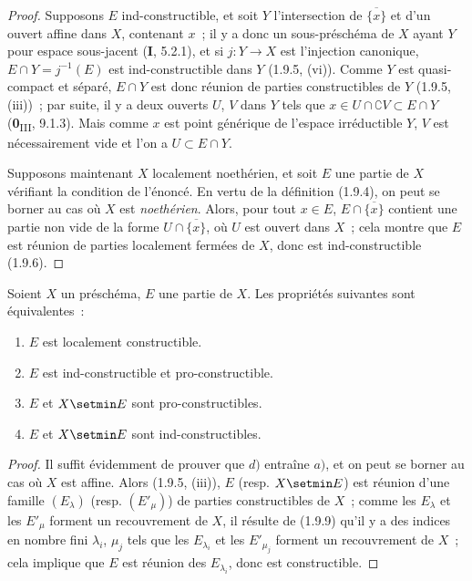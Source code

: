 \begin{proof}
Supposons $E$ ind-constructible, et soit $Y$ l'intersection de
$\overline{\{x\}}$ et d'un ouvert affine dans $X$, contenant $x$~; il y a
donc un sous-préschéma de $X$ ayant $Y$ pour espace sous-jacent (\textbf{I}, 5.2.1),
et si $j:Y\to X$ est l'injection canonique,
$E\cap Y=j^{-1}(E)$ est ind-constructible dans $Y$ (1.9.5, (vi)). Comme $Y$
est quasi-compact et séparé, $E\cap Y$ est donc réunion de parties
constructibles de $Y$ (1.9.5, (iii))~; par suite, il y a deux ouverts $U$,
$V$ dans $Y$ tels que
$x\in U\cap\complement V\subset E\cap Y$ (\textbf{0}\textsubscript{III}, 9.1.3).
Mais comme $x$ est point générique de l'espace irréductible $Y$, $V$ est
nécessairement vide et l'on a $U\subset E\cap Y$.

Supposons maintenant $X$ localement noethérien, et soit $E$ une partie de
$X$ vérifiant la condition de l'énoncé. En vertu de la définition (1.9.4),
on peut se borner au cas où $X$ est \emph{noethérien}. Alors, pour tout $x\in E$,
$E\cap\overline{\{x\}}$ contient une partie non vide de la forme
$U\cap\overline{\{x\}}$, où $U$ est ouvert dans $X$~; cela montre que $E$
est réunion de parties localement fermées de $X$, donc est
ind-constructible (1.9.6).
\end{proof}

\begin{proposition}[1.9.11]
\label{IV.1.9.11-fr}
Soient $X$ un préschéma, $E$ une partie de $X$. Les propriétés suivantes sont
équivalentes~:
\begin{enumerate}
  \item[a)] $E$ est localement constructible.
  \item[b)] $E$ est ind-constructible et pro-constructible.
  \item[c)] $E$ et $X\setmin E$ sont pro-constructibles.
  \item[d)] $E$ et $X\setmin E$ sont ind-constructibles.
\end{enumerate}
\end{proposition}

\begin{proof}
Il suffit évidemment de prouver que $d)$ entraîne $a)$, et on peut se borner
au cas où $X$ est affine. Alors (1.9.5, (iii)), $E$ (resp. $X\setmin E$) est réunion
d'une famille $(E_\lambda)$ (resp. $(E'_\mu)$) de parties constructibles de
$X$~; comme les $E_\lambda$ et les $E'_\mu$ forment un recouvrement de $X$,
il résulte de (1.9.9) qu'il y a des indices en nombre fini $\lambda_i$,
$\mu_j$ tels que les $E_{\lambda_i}$ et les $E'_{\mu_j}$ forment un
recouvrement de $X$~; cela implique que $E$ est réunion des
$E_{\lambda_i}$, donc est constructible.
\end{proof}

